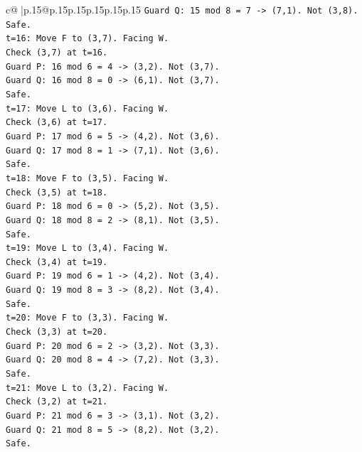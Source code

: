 \documentclass{article}
\begin{document}
{\begin{supertabular}{c@{$\;$}|p{.15\linewidth}@{}p{.15\linewidth}p{.15\linewidth}p{.15\linewidth}p{.15\linewidth}p{.15\linewidth}}
{{{\texttt{Guard Q: 15 mod 8 = 7 {-}> (7,1). Not (3,8).} \\
\texttt{Safe.} \\
\texttt{t=16: Move F to (3,7). Facing W.} \\
\texttt{Check (3,7) at t=16.} \\
\texttt{Guard P: 16 mod 6 = 4 {-}> (3,2). Not (3,7).} \\
\texttt{Guard Q: 16 mod 8 = 0 {-}> (6,1). Not (3,7).} \\
\texttt{Safe.} \\
\texttt{t=17: Move L to (3,6). Facing W.} \\
\texttt{Check (3,6) at t=17.} \\
\texttt{Guard P: 17 mod 6 = 5 {-}> (4,2). Not (3,6).} \\
\texttt{Guard Q: 17 mod 8 = 1 {-}> (7,1). Not (3,6).} \\
\texttt{Safe.} \\
\texttt{t=18: Move F to (3,5). Facing W.} \\
\texttt{Check (3,5) at t=18.} \\
\texttt{Guard P: 18 mod 6 = 0 {-}> (5,2). Not (3,5).} \\
\texttt{Guard Q: 18 mod 8 = 2 {-}> (8,1). Not (3,5).} \\
\texttt{Safe.} \\
\texttt{t=19: Move L to (3,4). Facing W.} \\
\texttt{Check (3,4) at t=19.} \\
\texttt{Guard P: 19 mod 6 = 1 {-}> (4,2). Not (3,4).} \\
\texttt{Guard Q: 19 mod 8 = 3 {-}> (8,2). Not (3,4).} \\
\texttt{Safe.} \\
\texttt{t=20: Move F to (3,3). Facing W.} \\
\texttt{Check (3,3) at t=20.} \\
\texttt{Guard P: 20 mod 6 = 2 {-}> (3,2). Not (3,3).} \\
\texttt{Guard Q: 20 mod 8 = 4 {-}> (7,2). Not (3,3).} \\
\texttt{Safe.} \\
\texttt{t=21: Move L to (3,2). Facing W.} \\
\texttt{Check (3,2) at t=21.} \\
\texttt{Guard P: 21 mod 6 = 3 {-}> (3,1). Not (3,2).} \\
\texttt{Guard Q: 21 mod 8 = 5 {-}> (8,2). Not (3,2).} \\
\texttt{Safe.} \\
}}}
\end{supertabular}}
\end{document}
